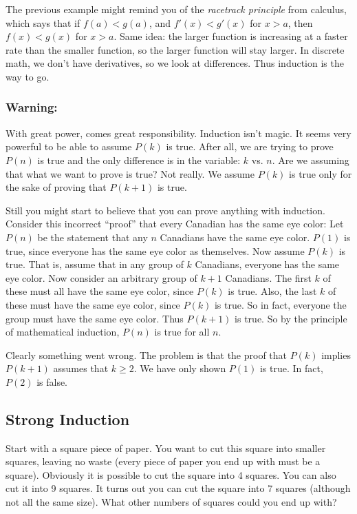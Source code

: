 \documentclass[12pt]{article}
\begin{document}
The previous example might remind you of the {\em racetrack principle} from calculus, which says that if $f(a) < g(a)$, and $f'(x) < g'(x)$ for $x > a$, then $f(x) < g(x)$ for $x > a$.  Same idea: the larger function is increasing at a faster rate than the smaller function, so the larger function will stay larger.  In discrete math, we don't have derivatives, so we look at differences.  Thus induction is the way to go.

\subsubsection*{Warning:}

With great power, comes great responsibility.  Induction isn't magic.  It seems very powerful to be able to assume $P(k)$ is true.  After all, we are trying to prove $P(n)$ is true and the only difference is in the variable: $k$ vs. $n$.  Are we assuming that what we want to prove is true?  Not really.  We assume $P(k)$ is true only for the sake of proving that $P(k+1)$ is true.  

Still you might start to believe that you can prove anything with induction. Consider this incorrect ``proof'' that every Canadian has the same eye color: Let $P(n)$ be the statement that any $n$ Canadians have the same eye color.  $P(1)$ is true, since everyone has the same eye color as themselves.  Now assume $P(k)$ is true.  That is, assume that in any group of $k$ Canadians, everyone has the same eye color.  Now consider an arbitrary group of $k+1$ Canadians.  The first $k$ of these must all have the same eye color, since $P(k)$ is true.  Also, the last $k$ of these must have the same eye color, since $P(k)$ is true.  So in fact, everyone the group must have the same eye color.  Thus $P(k+1)$ is true.  So by the principle of mathematical induction, $P(n)$ is true for all $n$.

Clearly something went wrong.  The problem is that the proof that $P(k)$ implies $P(k+1)$ assumes that $k \ge 2$.  We have only shown $P(1)$ is true.  In fact, $P(2)$ is false.



\subsection{Strong Induction}

\begin{activity}
Start with a square piece of paper.  You want to cut this square into smaller squares, leaving no waste (every piece of paper you end up with must be a square).  Obviously it is possible to cut the square into 4 squares.  You can also cut it into 9 squares.  It turns out you can cut the square into 7 squares (although not all the same size).  What other numbers of squares could you end up with?
\end{activity}
\end{document}
